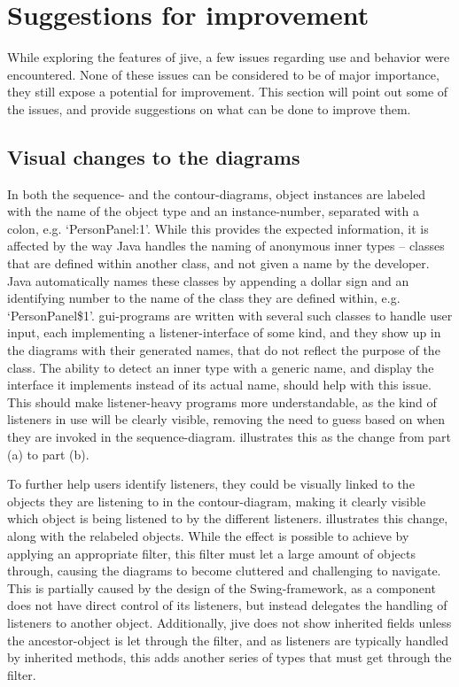 \section{Suggestions for improvement}\label{jiveSuggestions}

While exploring the features of \gls{jive}, a few issues regarding use and behavior were encountered.
None of these issues can be considered to be of major importance, they still expose a potential for improvement.
This section will point out some of the issues, and provide suggestions on what can be done to improve them.

\subsection{Visual changes to the diagrams}\label{jiveSuggestionsVisual}
In both the sequence- and the contour-diagrams, object instances are labeled with the name of the object type and an instance-number, separated with a colon, e.g. `PersonPanel:1'.
While this provides the expected information, it is affected by the way Java handles the naming of anonymous inner types -- classes that are defined within another class, and not given a name by the developer.
Java automatically names these classes by appending a dollar sign and an identifying number to the name of the class they are defined within, e.g. `PersonPanel\$1'.
\gls{gui}-programs are written with several such classes to handle user input, each implementing a listener-interface of some kind, and they show up in the diagrams with their generated names, that do not reflect the purpose of the class.
The ability to detect an inner type with a generic name, and display the interface it implements instead of its actual name, should help with this issue.
This should make listener-heavy programs more understandable, as the kind of listeners in use will be clearly visible, removing the need to guess based on when they are invoked in the sequence-diagram.
 illustrates this as the change from part (a) to part (b).

To further help users identify listeners, they could be visually linked to the objects they are listening to in the contour-diagram, making it clearly visible which object is being listened to by the different listeners.
 illustrates this change, along with the relabeled objects.
While the effect is possible to achieve by applying an appropriate filter, this filter must let a large amount of objects through, causing the diagrams to become cluttered and challenging to navigate.
This is partially caused by the design of the Swing-framework, as a component does not have direct control of its listeners, but instead delegates the handling of listeners to another object.
Additionally, \gls{jive} does not show inherited fields unless the ancestor-object is let through the filter, and as listeners are typically handled by inherited methods, this adds another series of types that must get through the filter.

